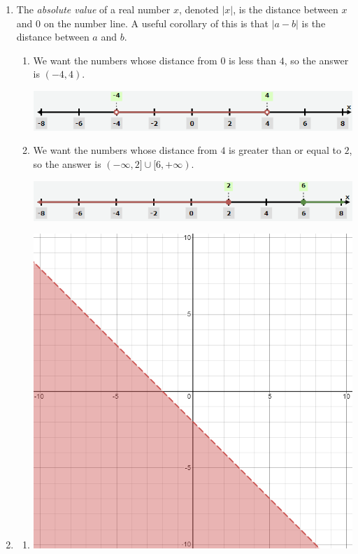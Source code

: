 \begin{enumerate}
\begin{enumerate}
\end{enumerate}
\item The \emph{absolute value} of a real number $x$, denoted $\lvert x\rvert$, is the distance between $x$ and $0$ on the number line. A useful corollary of this is that $\lvert a - b\rvert$ is the distance between $a$ and $b$.
\begin{enumerate}
\item We want the numbers whose distance from $0$ is less than $4$, so the answer is $\boxed{(-4,4)}$.
\begin{center}
\includegraphics[scale=0.5]{lin-ineq-ans-4a.png}
\end{center}
\item We want the numbers whose distance from $4$ is greater than or equal to $2$, so the answer is $\boxed{(-\infty,2]\cup [6, +\infty)}$.
\begin{center}
\includegraphics[scale=0.5]{lin-ineq-ans-4b.png}
\end{center}
\end{enumerate}
\item \begin{enumerate}
\item \hspace{1mm}
\begin{center}
\includegraphics[scale=0.4]{lin-ineq-ans-5a.png}

\end{center}
\end{enumerate}
\end{enumerate}
